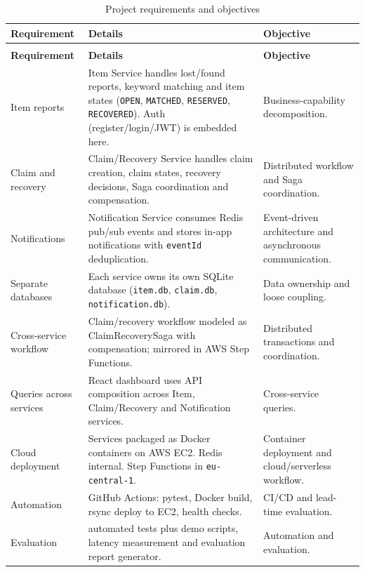 \documentclass[11pt,a4paper]{article}
\begin{document}
\begin{longtable}{@{}
>{\raggedright\arraybackslash}p{3.0cm}
>{\raggedright\arraybackslash}p{7.4cm}
>{\raggedright\arraybackslash}p{4.0cm}
@{}}
\caption{Project requirements and objectives}
\label{tab:requirements} \\
\toprule
\textbf{Requirement} & \textbf{Details} & \textbf{Objective} \\
\midrule
\endfirsthead

\multicolumn{3}{c}{\tablename\ \thetable\ -- continued} \\
\toprule
\textbf{Requirement} & \textbf{Details} & \textbf{Objective} \\
\midrule
\endhead

Item reports &
Item Service handles lost/found reports, keyword matching and item states
(\texttt{OPEN}, \texttt{MATCHED}, \texttt{RESERVED}, \texttt{RECOVERED}). Auth (register/login/JWT) is embedded here. &
Business-capability decomposition. \\[0.45em]

Claim and recovery &
Claim/Recovery Service handles claim creation, claim states, recovery decisions, Saga coordination and compensation. &
Distributed workflow and Saga coordination. \\[0.45em]

Notifications &
Notification Service consumes Redis pub/sub events and stores in-app notifications with \texttt{eventId} deduplication. &
Event-driven architecture and asynchronous communication. \\[0.45em]

Separate databases &
Each service owns its own SQLite database (\texttt{item.db}, \texttt{claim.db}, \texttt{notification.db}). &
Data ownership and loose coupling. \\[0.45em]

Cross-service workflow &
Claim/recovery workflow modeled as ClaimRecoverySaga with compensation; mirrored in AWS Step Functions. &
Distributed transactions and coordination. \\[0.45em]

Queries across services &
React dashboard uses API composition across Item, Claim/Recovery and Notification services. &
Cross-service queries. \\[0.45em]

Cloud deployment &
Services packaged as Docker containers on AWS EC2. Redis internal. Step Functions in \texttt{eu-central-1}. &
Container deployment and cloud/serverless workflow. \\[0.45em]

Automation &
GitHub Actions: pytest, Docker build, rsync deploy to EC2, health checks. &
CI/CD and lead-time evaluation. \\[0.45em]

Evaluation &
31 automated tests plus demo scripts, latency measurement and evaluation report generator. &
Automation and evaluation. \\

\bottomrule
\end{longtable}
\endgroup
\end{document}
